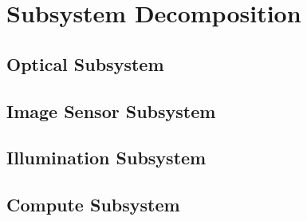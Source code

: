 \section{Subsystem Decomposition}

\subsection{Optical Subsystem}


\subsection{Image Sensor Subsystem}


\subsection{Illumination Subsystem}


\subsection{Compute Subsystem}

